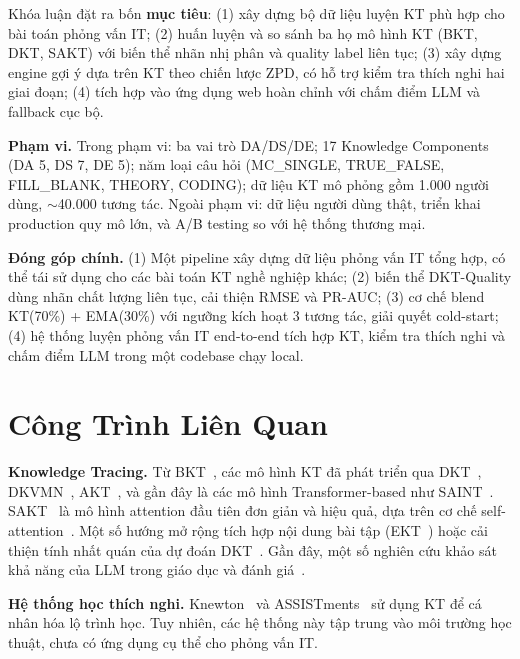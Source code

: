 \documentclass[conference]{IEEEtran}
\newcommand{\prauc}{PR-AUC}
\begin{document}
Khóa luận đặt ra bốn \textbf{mục tiêu}: (1) xây dựng bộ dữ liệu luyện KT phù hợp cho bài toán phỏng vấn IT; (2) huấn luyện và so sánh ba họ mô hình KT (BKT, DKT, SAKT) với biến thể nhãn nhị phân và quality label liên tục; (3) xây dựng engine gợi ý dựa trên KT theo chiến lược ZPD, có hỗ trợ kiểm tra thích nghi hai giai đoạn; (4) tích hợp vào ứng dụng web hoàn chỉnh với chấm điểm LLM và fallback cục bộ.

\textbf{Phạm vi.} Trong phạm vi: ba vai trò DA/DS/DE; 17 Knowledge Components (DA 5, DS 7, DE 5); năm loại câu hỏi (MC\_SINGLE, TRUE\_FALSE, FILL\_BLANK, THEORY, CODING); dữ liệu KT mô phỏng gồm 1.000 người dùng, $\sim$40.000 tương tác. Ngoài phạm vi: dữ liệu người dùng thật, triển khai production quy mô lớn, và A/B testing so với hệ thống thương mại.

\textbf{Đóng góp chính.} (1) Một pipeline xây dựng dữ liệu phỏng vấn IT tổng hợp, có thể tái sử dụng cho các bài toán KT nghề nghiệp khác; (2) biến thể DKT-Quality dùng nhãn chất lượng liên tục, cải thiện RMSE và \prauc{}; (3) cơ chế blend KT(70\%) + EMA(30\%) với ngưỡng kích hoạt 3 tương tác, giải quyết cold-start; (4) hệ thống luyện phỏng vấn IT end-to-end tích hợp KT, kiểm tra thích nghi và chấm điểm LLM trong một codebase chạy local.

\section{Công Trình Liên Quan}
\label{sec:related}

\textbf{Knowledge Tracing.} Từ BKT~\cite{corbett1994knowledge}, các mô hình KT đã phát triển qua DKT~\cite{piech2015deep}, DKVMN~\cite{zhang2017dynamic}, AKT~\cite{ghosh2020context}, và gần đây là các mô hình Transformer-based như SAINT~\cite{choi2020towards}. SAKT~\cite{pandey2019self} là mô hình attention đầu tiên đơn giản và hiệu quả, dựa trên cơ chế self-attention~\cite{vaswani2017attention}. Một số hướng mở rộng tích hợp nội dung bài tập (EKT~\cite{liu2019ekt}) hoặc cải thiện tính nhất quán của dự đoán DKT~\cite{yeung2018addressing}. Gần đây, một số nghiên cứu khảo sát khả năng của LLM trong giáo dục và đánh giá~\cite{liu2023llm,brown2020language}.

\textbf{Hệ thống học thích nghi.} Knewton~\cite{ferreira2017knewton} và ASSISTments~\cite{heffernan2014assistments} sử dụng KT để cá nhân hóa lộ trình học. Tuy nhiên, các hệ thống này tập trung vào môi trường học thuật, chưa có ứng dụng cụ thể cho phỏng vấn IT.
\end{document}
